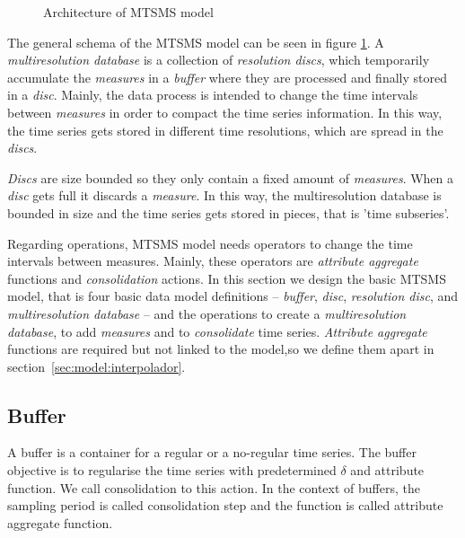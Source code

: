 \begin{figure}[tp]
\centering

\caption{Architecture of MTSMS model}
\label{fig:model:mtsdb}
\end{figure}

The general schema of the MTSMS model can be seen in figure
\ref{fig:model:mtsdb}.  A \emph{multiresolution database} is a
collection of \emph{resolution discs}, which temporarily accumulate
the \emph{measures} in a \emph{buffer} where they are processed and
finally stored in a \emph{disc}. Mainly, the data process is intended
to change the time intervals between \emph{measures} in order to
compact the time series information. In this way, the time series gets
stored in different time resolutions, which are spread in the
\emph{discs}.

\emph{Discs} are size bounded so they only contain a fixed amount of
\emph{measures}. When a \emph{disc} gets full it discards a
\emph{measure}. In this way, the multiresolution database is bounded
in size and the time series gets stored in pieces, that is 'time
subseries'.




Regarding operations, MTSMS model needs operators to change the time
intervals between measures. Mainly, these operators are
\emph{attribute aggregate} functions and \emph{consolidation}
actions. In this section we design the basic MTSMS model, that is four
basic data model definitions -- \emph{buffer}, \emph{disc},
\emph{resolution disc}, and \emph{multiresolution database} -- and the
operations to create a \emph{multiresolution database}, to add
\emph{measures} and to \emph{consolidate} time series. \emph{Attribute
  aggregate} functions are required but not linked to the model,so we
define them apart in section~\ref{sec:model:interpolador}.






\subsection{Buffer}\label{sec:model:buffer}

A buffer is a container for a regular or a no-regular time series. The
buffer objective is to regularise the time series with predetermined $\delta$ 
and attribute function. We call consolidation to this action. In the context
of buffers, the sampling period is called consolidation step
and the function is called attribute aggregate function.

